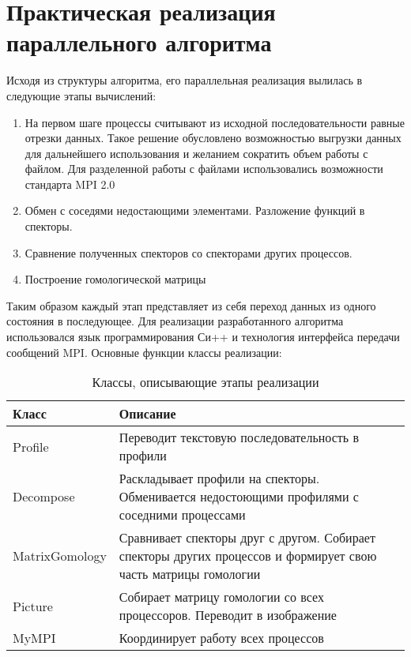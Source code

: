 \chapter{Практическая реализация параллельного алгоритма} \label{chapt3}

Исходя из структуры алгоритма, его параллельная реализация вылилась в следующие
этапы вычислений:
\begin{enumerate}
  \item На первом шаге процессы считывают из исходной последовательности равные
  отрезки данных. Такое решение обусловлено возможностью выгрузки данных
  для дальнейшего использования и желанием сократить объем работы с файлом.
  Для разделенной работы с файлами использовались возможности стандарта MPI 2.0
  \item Обмен с соседями недостающими элементами. Разложение функций в спекторы.
  \item Сравнение полученных спекторов со спекторами других процессов.
  \item Построение гомологической матрицы
\end{enumerate}
Таким образом каждый этап представляет из себя переход данных из одного состояния
в последующее.
\bigskip
Для реализации разработанного алгоритма использовался язык программирования Си++
и технология интерфейса передачи сообщений MPI.
\bigskip
Основные функции классы реализации:

\begin{table}[htbp]
\caption{Классы, описывающие этапы реализации}
\label{tabular:timesandtenses}
\begin{center}
\begin{tabular}{| p{3cm} | p{10cm} |}
\hline
Класс & Описание  \\
\hline
Profile & Переводит текстовую последовательность в профили  \\
\hline
Decompose &  Раскладывает профили на спекторы. Обменивается недостоющими профилями
с соседними процессами\\
\hline
MatrixGomology &  Сравнивает спекторы друг с другом. Собирает спекторы других
процессов и формирует свою часть матрицы гомологии\\
\hline
Picture &  Собирает матрицу гомологии со всех процессоров. Переводит в изображение\\
MyMPI & Координирует работу всех процессов \\
\hline
\end{tabular}
\end{center}
\end{table}
\clearpage
